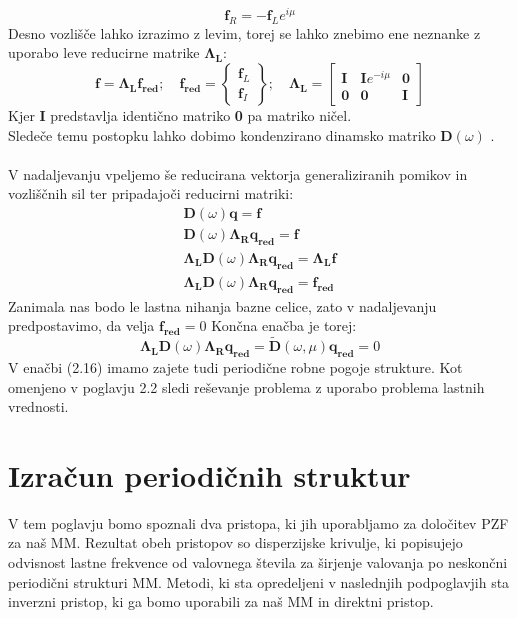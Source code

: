 \documentclass[12pt]{report}
\begin{document}
\begin{equation}
  \mathbf{f}_R = -\mathbf{f}_L e^{i\mu}
\end{equation}
Desno vozlišče lahko izrazimo z levim, torej se lahko znebimo ene neznanke z uporabo leve reducirne matrike $\mathbf{\Lambda_L}$:
\begin{equation}
  \mathbf{f}=\mathbf{\Lambda_L f_{red}}; \quad 
  \mathbf{f_{red}} = \begin{Bmatrix}
    \mathbf{f}_L \\
    \mathbf{f}_I
  \end{Bmatrix}; \quad
  \mathbf{\Lambda_L} = \begin{bmatrix}
    \mathbf{I} & \mathbf{I}e^{-i\mu} & \mathbf{0} \\
    \mathbf{0} & \mathbf{0} & \mathbf{I}
  \end{bmatrix}
\end{equation}
Kjer \textbf{I} predstavlja identično matriko \textbf{0} pa matriko ničel.\\
Sledeče temu postopku lahko dobimo kondenzirano dinamsko matriko $\mathbf{D}(\omega)$ \cite{kosir}. 
\\
\\
V nadaljevanju vpeljemo še reducirana vektorja generaliziranih pomikov in vozliščnih sil ter pripadajoči reducirni matriki:
\begin{equation*}
  \begin{aligned}
    \mathbf{D}(\omega)\mathbf{q}=\mathbf{f} \\
    \mathbf{D}(\omega)\mathbf{\Lambda_R q_{red}} = \mathbf{f} \\
    \mathbf{\Lambda_L} \mathbf{D}(\omega)\mathbf{\Lambda_R q_{red}} = \mathbf{\Lambda_L} \mathbf{f} \\
    \mathbf{\Lambda_L} \mathbf{D}(\omega)\mathbf{\Lambda_R q_{red}} = \mathbf{f_{red}}
  \end{aligned}
\end{equation*}
Zanimala nas bodo le lastna nihanja bazne celice, zato v nadaljevanju predpostavimo, da velja $\mathbf{f_{red}}=0$
Končna enačba je torej:
\begin{equation}
  \mathbf{\Lambda_L} \mathbf{D}(\omega)\mathbf{\Lambda_R q_{red}} = \mathbf{\widetilde{D}}(\omega, \mu) \mathbf{q_{red}} = 0
\end{equation}
V enačbi (2.16) imamo zajete tudi periodične robne pogoje strukture. Kot omenjeno v poglavju 2.2 sledi reševanje problema z uporabo problema
lastnih vrednosti.

\section{Izračun periodičnih struktur}
V tem poglavju bomo spoznali dva pristopa, ki jih uporabljamo za določitev \ac{PZF} za naš \ac{MM}. Rezultat obeh pristopov so disperzijske krivulje, ki popisujejo odvisnost lastne frekvence od valovnega števila 
za širjenje valovanja po neskončni periodični strukturi \ac{MM}. Metodi, ki sta opredeljeni v naslednjih podpoglavjih sta inverzni pristop, ki ga bomo uporabili za naš \ac{MM} in direktni pristop.
\end{document}
